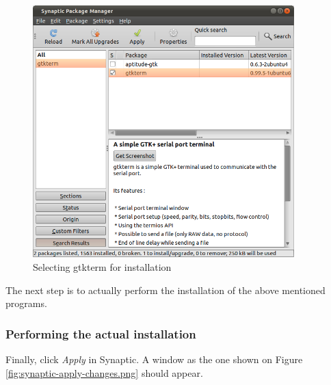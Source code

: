 \documentclass[a4paper, 10pt]{article}
\begin{document}
    \begin{figure}[H]
    \centering
        \includegraphics[width=0.9\textwidth]{./png-install-guide/synaptic-gtkterm.png}
        \caption{Selecting gtkterm for installation}
        \label{fig:synaptic-gtkterm}
    \end{figure}

The next step is to actually perform the installation of the above mentioned programs.

\subsubsection{Performing the actual installation}

Finally, click \emph{Apply} in Synaptic.
A window as the one shown on Figure \ref{fig:synaptic-apply-changes.png}
should appear.
\end{document}
